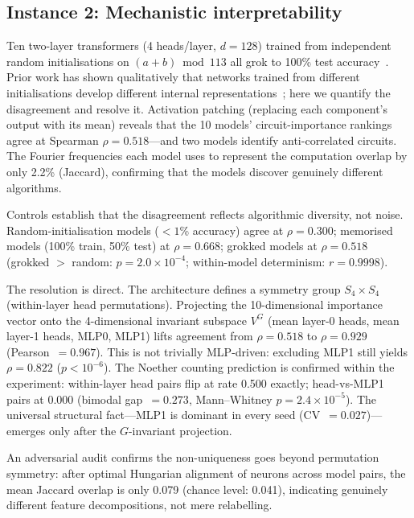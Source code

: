 \documentclass[11pt]{article}
\begin{document}
\subsection*{Instance 2: Mechanistic interpretability}

Ten two-layer transformers (4 heads/layer, $d = 128$) trained from
independent random initialisations on $(a + b) \bmod 113$ all grok to
100\% test accuracy~\citep{nanda2023progress}.  Prior work has shown
qualitatively that networks trained from different initialisations
develop different internal representations~\citep{chughtai2023toy};
here we quantify the disagreement and resolve it.  Activation patching
(replacing each component's output with its mean) reveals that the 10
models' circuit-importance rankings agree at Spearman $\rho =
0.518$---and two models identify anti-correlated circuits.  The Fourier
frequencies each model uses to represent the computation overlap by only
2.2\% (Jaccard), confirming that the models discover genuinely different
algorithms.

Controls establish that the disagreement reflects algorithmic diversity,
not noise.  Random-initialisation models ($< 1$\% accuracy) agree at
$\rho = 0.300$; memorised models (100\% train, 50\% test) at $\rho =
0.668$; grokked models at $\rho = 0.518$ (grokked $>$ random:
$p = 2.0 \times 10^{-4}$; within-model determinism: $r = 0.9998$).

The resolution is direct.  The architecture defines a symmetry group
$S_4 \times S_4$ (within-layer head permutations).  Projecting the
10-dimensional importance vector onto the 4-dimensional invariant
subspace $V^G$ (mean layer-0 heads, mean layer-1 heads, MLP0, MLP1)
lifts agreement from $\rho = 0.518$ to $\rho = 0.929$ (Pearson~$=
0.967$).  This is not trivially MLP-driven: excluding MLP1 still yields
$\rho = 0.822$ ($p < 10^{-6}$).  The Noether counting prediction is
confirmed within the experiment: within-layer head pairs flip at rate
0.500 exactly; head-vs-MLP1 pairs at 0.000 (bimodal
gap~$= 0.273$, Mann--Whitney $p = 2.4 \times 10^{-5}$).  The universal structural fact---MLP1 is
dominant in every seed (CV~$= 0.027$)---emerges only after the
$G$-invariant projection.

An adversarial audit confirms the non-uniqueness goes beyond
permutation symmetry: after optimal Hungarian alignment of neurons
across model pairs, the mean Jaccard overlap is only 0.079 (chance
level: 0.041), indicating genuinely different feature decompositions,
not mere relabelling.
\end{document}

